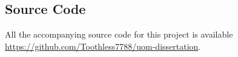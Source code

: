 \documentclass[draft]{article}
\begin{document}
\begin{appendices}


    \section{Source Code}
    All the accompanying source code for this project is available 
    \\
    \url{https://github.com/Toothless7788/uom-dissertation}. 



\end{appendices}
\end{document}
